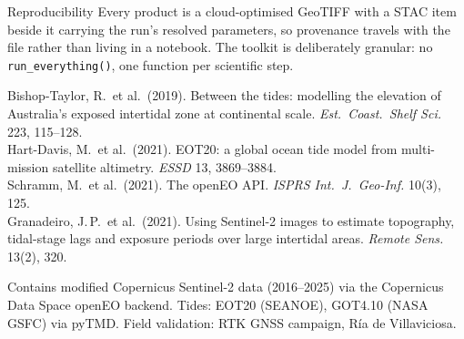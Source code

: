 \begin{pblock}{Reproducibility}
Every product is a cloud-optimised GeoTIFF with a STAC item beside it carrying
the run's resolved parameters, so provenance travels with the file rather than
living in a notebook. The toolkit is deliberately granular: no
\texttt{run\_everything()}, one function per scientific step.
\end{pblock}

\vspace{4mm}
{\color{PSlate}\small
Bishop-Taylor, R.\ et al.\ (2019). Between the tides: modelling the elevation
of Australia's exposed intertidal zone at continental scale. \emph{Est.\
Coast.\ Shelf Sci.} 223, 115--128.\\[1.2mm]
Hart-Davis, M.\ et al.\ (2021). EOT20: a global ocean tide model from
multi-mission satellite altimetry. \emph{ESSD} 13, 3869--3884.\\[1.2mm]
Schramm, M.\ et al.\ (2021). The openEO API. \emph{ISPRS Int.\ J.\
Geo-Inf.} 10(3), 125.\\[1.2mm]
Granadeiro, J.\,P.\ et al.\ (2021). Using Sentinel-2 images to estimate
topography, tidal-stage lags and exposure periods over large intertidal
areas. \emph{Remote Sens.} 13(2), 320.

\vspace{3mm}
Contains modified Copernicus Sentinel-2 data (2016--2025) via the Copernicus
Data Space openEO backend. Tides: EOT20 (SEANOE), GOT4.10 (NASA GSFC) via
pyTMD. Field validation: RTK GNSS campaign, Ría de Villaviciosa.
\par}
